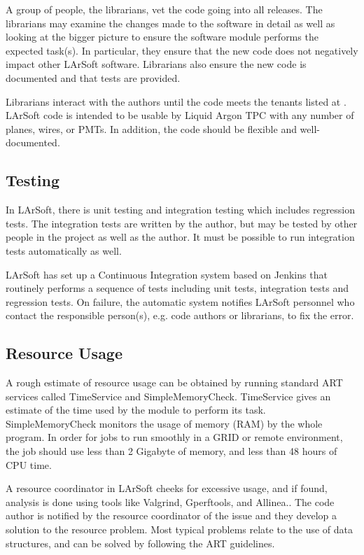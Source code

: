 \documentclass[12pt]{elsarticle}
\begin{document}
{A group of people, the librarians, vet the code going into all releases. The librarians may examine the changes made to the software in detail as well as looking at the bigger picture to ensure the software module performs the expected task(s). In particular, they ensure that the new code does not negatively impact other LArSoft software. Librarians also ensure the new code is documented and that tests are provided.

Librarians interact with the authors until the code meets the tenants listed at \cite{code-tenants}. LArSoft code is intended to be usable by Liquid Argon TPC with any number of planes, wires, or PMTs. In addition, the code should be flexible and well-documented. 

\subsection{Testing}

In LArSoft, there is unit testing and integration testing which includes regression tests. The integration tests are written by the author, but may be tested by other people in the project as well as the author. It must be possible to run integration tests automatically as well.

LArSoft has set up a Continuous Integration system based on Jenkins\cite{jenkins} that routinely performs a sequence of tests including unit tests, integration tests and regression tests. On failure, the automatic system notifies LArSoft personnel who contact the responsible person(s), e.g. code authors or librarians, to fix the error.

\subsection{Resource Usage}

A rough estimate of resource usage can be obtained by running standard ART services called TimeService and SimpleMemoryCheck. TimeService gives an estimate of the time used by the module to perform its task. SimpleMemoryCheck monitors the usage of memory (RAM) by the whole program. In order for jobs to run smoothly in a GRID or remote environment, the job should use less than 2 Gigabyte of memory, and less than 48 hours of CPU time.

A resource coordinator in LArSoft cheeks for excessive usage, and if found, analysis is done using tools like Valgrind\cite{valgrind}, Gperftools\cite{gperf}, and Allinea.\cite {allinea}.
The code author is notified by the resource coordinator of the issue and they develop a solution to the resource problem. Most typical problems relate to the use of data structures, and can be solved by following the ART guidelines.\cite{art-guide}
 
}
\end{document}
